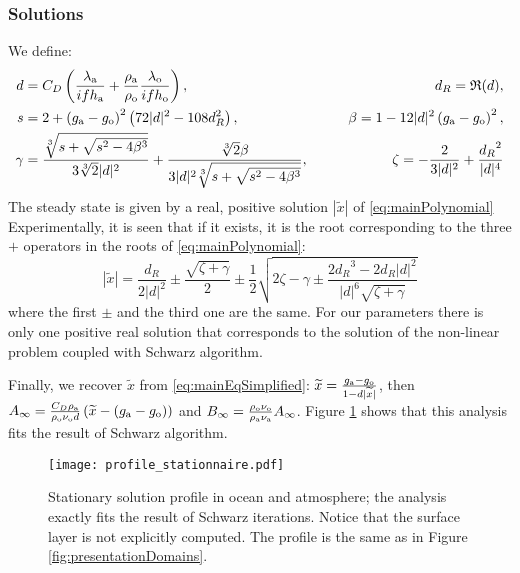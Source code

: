 \subsubsection{Solutions}
\label{sec:summary_stationnary}
We define:
\begin{equation}
    \begin{aligned}
    {d} &= C_D\left(
    \frac{\lambda_{\rm a}}{if h_{\rm a}} 
    +\frac{\rho_{\rm a}}{\rho_{\rm o}}\frac{\lambda_{\rm o}}{if h_{\rm o}} \right), \qquad &d_R = \mathfrak{R}(d),
    \\
    s &= 2 + \left(g_{\rm a} - g_{\rm o}\right)^2 \left(72 |d|^2 - 108 d_R^2 \right),
    \qquad
    &\beta = 1 - 12 |d|^2 \left(g_{\rm a} - g_{\rm o}\right)^2, \\
    \gamma &= \frac{\sqrt[3]{s+\sqrt{s^2 - 4 \beta^3}}}{3\sqrt[3]{2}|d|^2} +\frac{\sqrt[3]{2}\beta}{3|d|^2 \sqrt[3]{s+\sqrt{s^2 - 4 \beta^3}}}, 
    \qquad &\zeta = -\frac{2}{3|d|^2} + \frac{{d_R}^2}{|d|^4}
    \end{aligned}
\end{equation}
The steady state is given by a real, positive solution $|\widetilde{x}|$ of \eqref{eq:mainPolynomial}
Experimentally, it is seen that if it exists, it is the root corresponding to the three $+$ operators in the roots of \eqref{eq:mainPolynomial}:
\begin{equation}
    |\widetilde{x}| = \frac{{d_R}}{2|d|^2} \pm \frac{\sqrt{\zeta + \gamma }}{2} \pm \frac{1}{2}
    \sqrt{
    2\zeta - 
    \gamma
    \pm
    \frac{2{d_R}^3 - 2{d_R}|d|^2}{|d|^6 \sqrt{\zeta + \gamma }}
    }
\end{equation}
where the first $\pm$ and the
third one are the same. For our parameters there is only one positive real solution that corresponds to the solution of the non-linear problem coupled with Schwarz algorithm.
\par
Finally, we recover $\widetilde{x}$ from \eqref{eq:mainEqSimplified}: $\widetilde{x} = \frac{g_{\rm a} - g_{\rm o}}{1 - d |\widetilde{x}|}$, then $A_\infty = \frac{C_D \rho_{\rm a}}{\rho_{\rm o} \nu_{\rm o} d}\left(\widetilde{x} - (g_{\rm a} - g_{\rm o})\right)$ 
and
$ B_\infty =  \frac{\rho_{\rm o} \nu_{\rm o}}{\rho_{\rm a} \nu_{\rm a}}A_\infty$.
Figure \ref{fig:validation} shows that this analysis fits the result of Schwarz algorithm.
\begin{figure}
    \centering
    \texttt{[image: profile\_stationnaire.pdf]}
    \caption{Stationary solution profile in ocean and atmosphere;
	the analysis exactly fits the result of Schwarz iterations.
	Notice that the surface layer is not explicitly computed.
	The profile is the same as in Figure \ref{fig:presentationDomains}.}
    \label{fig:validation}
\end{figure}

